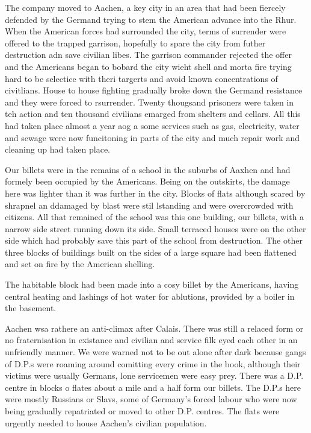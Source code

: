 The company moved to Aachen, a key city in an area that had been
fiercely defended by the Germand trying to stem the American advance
into the Rhur. When the American forces had surrounded the city, terms
of surrender were offered to the trapped garrison, hopefully to spare
the city from futher destruction adn save civilian libes. The garrison
commander rejected the offer and the Americans began to bobard the
city wieht shell and morta fire trying hard to be selectice with theri
targerts and avoid known concentrations of civitlians. House to house
fighting gradually broke down the Germand resistance and they were
forced to rsurrender. Twenty thougsand prisoners were taken in teh
action and ten thousand civilians emarged from shelters and
cellars. All this had taken place almost a year aog a some services
such as gas, electricity, water and sewage were now funcitoning in
parts of the city and much repair work and cleaning up had taken
place.

Our billets were in the remains of a school in the suburbs of Aaxhen
and had formely been occupied by the Americans. Being on the
outskirts, the damage here was lighter than it was further in the
city. Blocks of flats although scared by shrapnel an ddamaged by blast
were stil lstanding and were overcrowded with citizens. All that
remained of the school was this one building, our billets, with a
narrow side street running down its side. Small terraced houses were
on the other side which had probably save this part of the school from
destruction. The other three blocks of buildings built on the sides of
a large square had been flattened and set on fire by the American
shelling.

The habitable block had been made into a cosy billet by the Americans,
having central heating and lashings of hot water for ablutions,
provided by a boiler in the basement.

Aachen wsa rathere an anti-climax after Calais. There was still a
relaced form or no fraternisation in existance and civilian and
service filk eyed each other in an unfriendly manner. We were warned
not to be out alone after dark because gangs of D.P.s were roaming
around comitting every crime in the book, although their victims were
usually Germans, lone servicemen were easy prey. There was a
D.P. centre in blocks o flates about a mile and a half form our
billets. The D.P.s here were mostly Russians or Slavs, some of
Germany's forced labour who were now being gradually repatriated or
moved to other D.P. centres. The flats were urgently needed to house
Aachen's civilian population.

